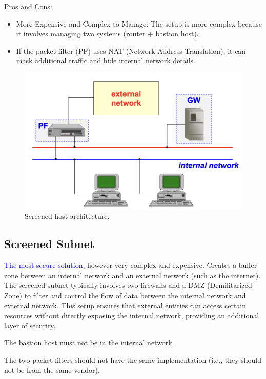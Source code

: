 \begin{multicols}{2}
    Pros and Cons:
    \begin{itemize}
        \item More Expensive and Complex to Manage: The setup is more complex because it involves managing two systems (router + bastion host).
        \item If the packet filter (PF) uses NAT (Network Address Translation), it can mask additional traffic and hide internal network details.
    \end{itemize}

\columnbreak

\begin{figure}[H]
    \centering
    \includegraphics[width=\linewidth]{Images/Firewalling/screened_host.png}
    \caption{Screened host architecture.}
\end{figure}
\end{multicols}

\clearpage

\subsection{Screened Subnet}
\textcolor{blue}{The most secure solution}, however very complex and expensive. Creates a buffer zone between an internal network and an external network (such as the internet). The screened subnet typically involves two firewalls and a DMZ (Demilitarized Zone) to filter and control the flow of data between the internal network and external network. This setup ensures that external entities can access certain resources without directly exposing the internal network, providing an additional layer of security.

\begin{tcolorbox}[colback=red!10!white, colframe=red!70!black, coltitle=white, title=Beware]
The bastion host must not be in the internal network.

\hfill 

The two packet filters should not have the same implementation (i.e., they should not be from the same vendor).
\end{tcolorbox}

